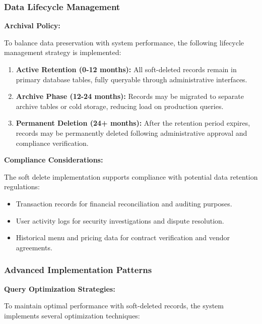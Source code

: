 \documentclass[12pt,a4paper]{article}
\begin{document}
\begin{tcolorbox}[colback=primaryblue!5, colframe=primaryblue, boxrule=1pt, arc=3pt, left=10pt, right=10pt, top=8pt, bottom=8pt]
\subsubsection{Data Lifecycle Management}

\textbf{Archival Policy:}

To balance data preservation with system performance, the following lifecycle management strategy is implemented:

\begin{enumerate}[leftmargin=2em, itemsep=6pt]
    \item \textbf{Active Retention (0-12 months):} All soft-deleted records remain in primary database tables, fully queryable through administrative interfaces.
    \item \textbf{Archive Phase (12-24 months):} Records may be migrated to separate archive tables or cold storage, reducing load on production queries.
    \item \textbf{Permanent Deletion (24+ months):} After the retention period expires, records may be permanently deleted following administrative approval and compliance verification.
\end{enumerate}

\vspace{0.5em}

\textbf{Compliance Considerations:}

The soft delete implementation supports compliance with potential data retention regulations:

\begin{itemize}[leftmargin=2em, itemsep=6pt]
    \item Transaction records for financial reconciliation and auditing purposes.
    \item User activity logs for security investigations and dispute resolution.
    \item Historical menu and pricing data for contract verification and vendor agreements.
\end{itemize}

\subsubsection{Advanced Implementation Patterns}

\textbf{Query Optimization Strategies:}

To maintain optimal performance with soft-deleted records, the system implements several optimization techniques:


\end{tcolorbox}
\end{document}
